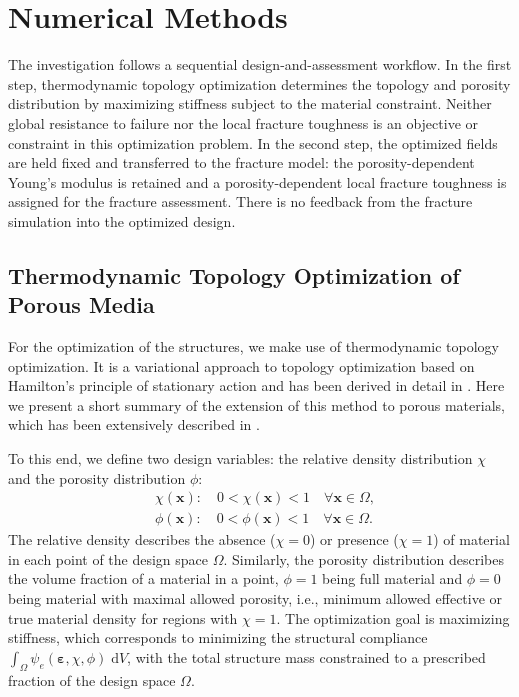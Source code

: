 \documentclass[
	pdflatex,
	sn-mathphys-num
]{sn-jnl}
\theoremstyle{thmstyleone}%
\theoremstyle{thmstyletwo}%
\theoremstyle{thmstylethree}%
\begin{document}
\section{Numerical Methods}\label{sec_methods}
The investigation follows a sequential design-and-assessment
workflow. In the first step, thermodynamic topology optimization
determines the topology and porosity distribution by maximizing
stiffness subject to the material constraint. Neither global
resistance to failure nor the local fracture toughness  is an
objective or constraint in this optimization problem. In the
second step, the optimized fields are held fixed and transferred
to the fracture model: the porosity-dependent Young's modulus is
retained and a porosity-dependent local fracture toughness is assigned for the
fracture assessment. There is no feedback from the fracture
simulation into the optimized design.

\subsection{Thermodynamic Topology Optimization of Porous Media}
\label{sec:topology_optimization}

For the optimization of the structures, we make use of
thermodynamic topology optimization. It is a variational
approach to topology optimization based on Hamilton's
principle of stationary action and has been derived in detail in
\cite{junker_extended_2021,junker_new_2021}. Here we present a
short summary of the extension of this method to porous
materials, which has been extensively described in \cite{pravda_macroscopic_2026}.

To this end, we define two design variables: the relative
density distribution $\chi$ and the porosity distribution
$\phi$:
\begin{align}
	\label{eq:chi_def}
	 & \chi(\boldsymbol{x}):\quad
	0<\chi(\boldsymbol{x})<1
	\quad\forall\boldsymbol{x}\in\Omega,
	\\
	\label{eq:phi_def}
	 & \phi(\boldsymbol{x}):\quad
	0<\phi(\boldsymbol{x})<1
	\quad\forall\boldsymbol{x}\in\Omega.
\end{align}
The relative density describes the absence ($\chi=0$) or
presence ($\chi=1$) of material in each point of the design
space $\Omega$. Similarly, the porosity distribution describes
the volume fraction of a material in a point, $\phi=1$ being
full material and $\phi=0$ being material with maximal allowed
porosity, i.e., minimum allowed effective or true material
density for regions with $\chi = 1$.
The optimization goal is maximizing stiffness, which
corresponds to minimizing the structural compliance
$\int_\Omega
\psi_e(\boldsymbol{\varepsilon},\chi,\phi)\;\mathrm{d}V$,
with the total structure mass constrained to a prescribed
fraction of the design space $\Omega$.
\end{document}
